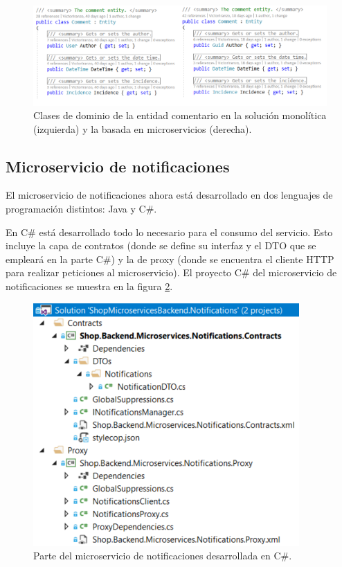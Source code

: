 \documentclass[11pt,spanish,listoffigures]{tfgetsinf}
\begin{document}
\begin{figure}[h]
\centering
\includegraphics[scale=0.7]{Comment}
\caption{Clases de dominio de la entidad comentario en la solución monolítica (izquierda) y la basada en microservicios (derecha).}
\label{fig:Comment}
\end{figure}

\newpage

\subsection{Microservicio de notificaciones}

El microservicio de notificaciones ahora está desarrollado en dos lenguajes de programación distintos: Java y C\#.

En C\# está desarrollado todo lo necesario para el consumo del servicio. Esto incluye la capa de contratos (donde se define su interfaz y el DTO que se empleará en la parte C\#) y la de proxy (donde se encuentra el cliente HTTP para realizar peticiones al microservicio). El proyecto C\# del microservicio de notificaciones se muestra en la figura \ref{fig:NotificationsC}.

\begin{figure}[h]
\centering
\includegraphics[scale=0.85]{NotificationsC}
\caption{Parte del microservicio de notificaciones desarrollada en C\#.}
\label{fig:NotificationsC}
\end{figure}
\end{document}
